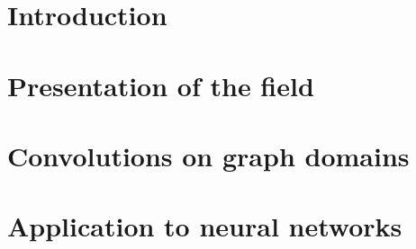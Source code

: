 \documentclass[12pt]{book}
\begin{document}

%
%


\newline


%

\dominitoc
\tableofcontents
\adjustmtc

%
%

\chapter*{Introduction}
\label{chp:int}
\todo{}

%
%

  \chapter{Presentation of the field}\label{chap:1}
  \newpage
  \vfill\minitoc\newpage

  \newpage
  \newpage
  \newpage

%
%

\setcounter{chapter}{1}
\chapter{Convolutions on graph domains}\label{chap:2}
\newpage
\vfill\minitoc\newpage

\newpage
\newpage
\newpage
\newpage
\newpage

%
%
 \setcounter{chapter}{2}
 \chapter{Application to neural networks}\label{chap:3}
 \newpage
 \vfill\minitoc\newpage


 \newpage
 \newpage
 \newpage
 \newpage
\end{document}
